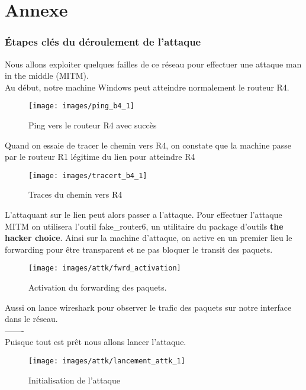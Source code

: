 \chapter*{Annexe}\label{annexe1}

\subsection*{Étapes clés du déroulement de l'attaque}


Nous allons exploiter quelques failles de ce réseau pour effectuer une attaque man in the middle (MITM).\\

Au début, notre machine Windows peut atteindre normalement le routeur R4.
\begin{figure}[H]
    \centering
    \texttt{[image: images/ping\_b4\_1]}
    \caption{Ping vers le routeur R4 avec succès}
    \label{fig:ping_b4_1}
\end{figure}
Quand on essaie de tracer le chemin vers R4, on constate que la machine passe par le routeur R1 légitime du lien pour atteindre R4
\begin{figure}[H]
    \centering
    \texttt{[image: images/tracert\_b4\_1]}
    \caption{Traces du chemin vers R4}
    \label{fig:tracert_b41}
\end{figure}
L'attaquant sur le lien peut alors passer a l'attaque.
Pour effectuer l'attaque MITM on utilisera l'outil fake\_router6, un utilitaire du package d'outils \textbf{the hacker choice}.
Ainsi sur la machine d'attaque, on active en un premier lieu le forwarding pour être transparent et ne pas bloquer le transit des paquets.
\begin{figure}[H]
    \centering
    \texttt{[image: images/attk/fwrd\_activation]}
    \caption{Activation du forwarding des paquets.}
    \label{fig:activ_fwrd}
\end{figure}
Aussi on lance wireshark pour observer le trafic des paquets sur notre interface dans le réseau.\\
-------\\
Puisque tout est prêt nous allons lancer l'attaque.

\begin{figure}[H]
    \centering
    \texttt{[image: images/attk/lancement\_attk\_1]}
    \caption{Initialisation de l'attaque}
    \label{fig:attk_init_1}
\end{figure}

